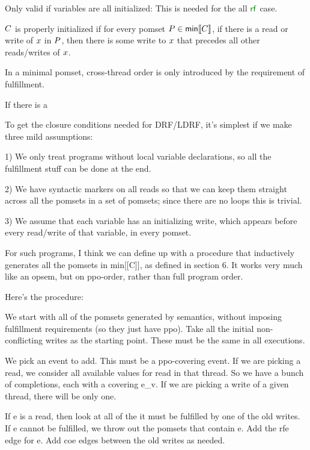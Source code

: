 

\begin{scope}
  \color{red}

  Only valid if variables are all initialized:
  This is needed for the all $\rrf$ case.
  
  $C$ is properly initialized if for every pomset
  $P\in\textsf{min}\llbracket C\rrbracket$, if there is a read or write of $x$ in $P$,
  then there is some write to $x$ that precedes all other reads/writes of
  $x$.


  In a minimal pomset, cross-thread order is only introduced by the
  requirement of fulfillment.

  If there is a 


  To get the closure conditions needed for DRF/LDRF, it's simplest if we make
  three mild assumptions:

  1) We only treat programs without local variable declarations, so all the
  fulfillment stuff can be done at the end.

  2) We have syntactic markers on all reads so that we can keep them straight
  across all the pomsets in a set of pomsets; since there are no loops this
  is trivial.

  3) We assume that each variable has an initializing write, which appears
  before every read/write of that variable, in every pomset.

  For such programs, I think we can define up with a procedure that
  inductively generates all the pomsets in min[[C]], as defined in section 6.
  It works very much like an opsem, but on ppo-order, rather than full
  program order.

  Here's the procedure:
  
  We start with all of the pomsets generated by semantics, without imposing
  fulfillment requirements (so they just have ppo).  Take all the initial
  non-conflicting writes as the starting point.  These must be the same in
  all executions.

  We pick an event to add.  This must be a ppo-covering event.  If we are
  picking a read, we consider all available values for  read in that
  thread.  So we have a bunch of completions, each with a covering e_v.  If
  we are picking a write of a given thread, there will be only one.

  If e is a read, then look at all of the 
  it must be fulfilled by one of the old writes.  If e cannot
  be fulfilled, we throw out the pomsets that contain e. Add the rfe edge for
  e.  Add coe edges between the old writes as needed.


\end{scope}
